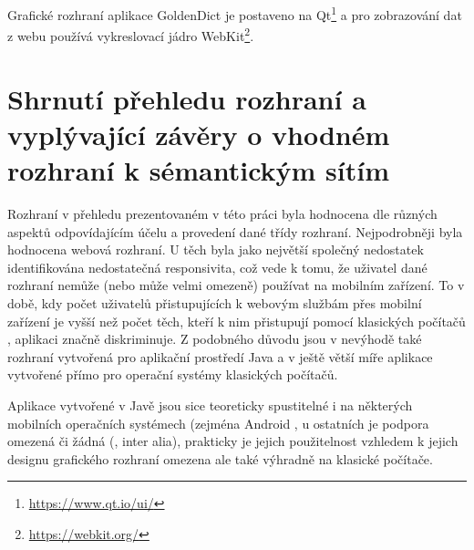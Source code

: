 \documentclass[a4paper, 11pt, oneside]{book}
\begin{document}
				Grafické rozhraní aplikace GoldenDict je postaveno na Qt\footnote{\url{https://www.qt.io/ui/}} a pro zobrazování dat z webu používá vykreslovací jádro WebKit\footnote{\url{https://webkit.org/}}. \parencite{goldendict2016}


		\chapter{Shrnutí přehledu rozhraní a vyplývající závěry o vhodném rozhraní k sémantickým sítím}
		\label{cha:shrnuti-prehledu}


			Rozhraní v přehledu prezentovaném v této práci byla hodnocena dle různých aspektů odpovídajícím účelu a provedení dané třídy rozhraní. Nejpodrobněji byla hodnocena webová rozhraní. U těch byla jako největší společný nedostatek identifikována nedostatečná responsivita, což vede k tomu, že uživatel dané rozhraní nemůže (nebo může velmi omezeně) používat na mobilním zařízení. To v době, kdy počet uživatelů přistupujících k webovým službám přes mobilní zařízení je vyšší než počet těch, kteří k nim přistupují pomocí klasických počítačů \parencite{Heisler2016}, aplikaci značně diskriminuje. Z podobného důvodu jsou v nevýhodě také rozhraní vytvořená pro aplikační prostředí Java a v ještě větší míře aplikace vytvořené přímo pro operační systémy klasických počítačů. 

			Aplikace vytvořené v Javě jsou sice teoreticky spustitelné i na některých mobilních operačních systémech (zejména Android \parencite{SX92854}, u ostatních je podpora omezená či žádná (\textcite{SX15501535}, \textcite{SX1193541} inter alia), prakticky je jejich použitelnost vzhledem k jejich designu grafického rozhraní omezena ale také výhradně na klasické počítače. 
\end{document}

